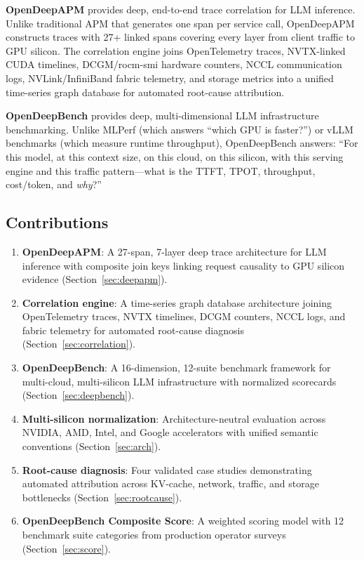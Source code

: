 \documentclass[conference,10pt]{IEEEtran}
\begin{document}
\textbf{OpenDeepAPM} provides deep, end-to-end trace correlation for LLM inference. Unlike traditional APM that generates one span per service call, OpenDeepAPM constructs traces with 27+ linked spans covering every layer from client traffic to GPU silicon. The correlation engine joins OpenTelemetry traces, NVTX-linked CUDA timelines, DCGM/rocm-smi hardware counters, NCCL communication logs, NVLink/InfiniBand fabric telemetry, and storage metrics into a unified time-series graph database for automated root-cause attribution.

\textbf{OpenDeepBench} provides deep, multi-dimensional LLM infrastructure benchmarking. Unlike MLPerf (which answers ``which GPU is faster?'') or vLLM benchmarks (which measure runtime throughput), OpenDeepBench answers: ``For this model, at this context size, on this cloud, on this silicon, with this serving engine and this traffic pattern---what is the TTFT, TPOT, throughput, cost/token, and \emph{why}?''

\subsection{Contributions}
\begin{enumerate}
\item \textbf{OpenDeepAPM}: A 27-span, 7-layer deep trace architecture for LLM inference with composite join keys linking request causality to GPU silicon evidence (Section~\ref{sec:deepapm}).
\item \textbf{Correlation engine}: A time-series graph database architecture joining OpenTelemetry traces, NVTX timelines, DCGM counters, NCCL logs, and fabric telemetry for automated root-cause diagnosis (Section~\ref{sec:correlation}).
\item \textbf{OpenDeepBench}: A 16-dimension, 12-suite benchmark framework for multi-cloud, multi-silicon LLM infrastructure with normalized scorecards (Section~\ref{sec:deepbench}).
\item \textbf{Multi-silicon normalization}: Architecture-neutral evaluation across NVIDIA, AMD, Intel, and Google accelerators with unified semantic conventions (Section~\ref{sec:arch}).
\item \textbf{Root-cause diagnosis}: Four validated case studies demonstrating automated attribution across KV-cache, network, traffic, and storage bottlenecks (Section~\ref{sec:rootcause}).
\item \textbf{OpenDeepBench Composite Score}: A weighted scoring model with 12 benchmark suite categories from production operator surveys (Section~\ref{sec:score}).
\end{enumerate}
\end{document}
